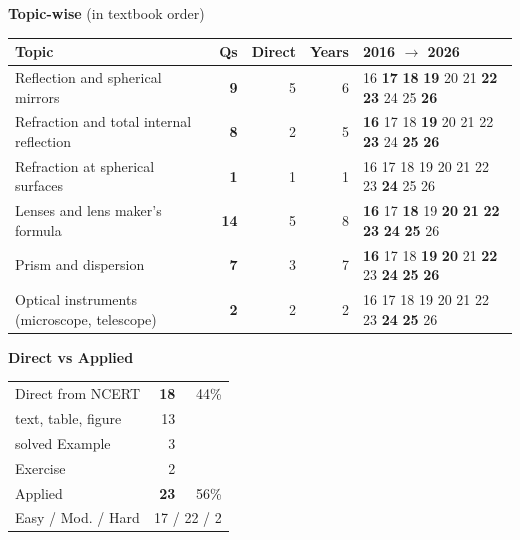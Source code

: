 {\small\textbf{\color{crimson}Topic-wise} (in textbook order)\par\smallskip
\begin{tabularx}{\linewidth}{@{}>{\raggedright\arraybackslash}Xrrrl@{}}\toprule
Topic & Qs & Direct & Years & 2016 $\rightarrow$ 2026\\\midrule
Reflection and spherical mirrors & \textbf{9} & 5 & 6 & {\scriptsize {\color{gray!45}16} \textbf{17} \textbf{18} \textbf{19} {\color{gray!45}20} {\color{gray!45}21} \textbf{22} \textbf{23} {\color{gray!45}24} {\color{gray!45}25} \textbf{26}}\\
Refraction and total internal reflection & \textbf{8} & 2 & 5 & {\scriptsize \textbf{16} {\color{gray!45}17} {\color{gray!45}18} \textbf{19} {\color{gray!45}20} {\color{gray!45}21} {\color{gray!45}22} \textbf{23} {\color{gray!45}24} \textbf{25} \textbf{26}}\\
Refraction at spherical surfaces & \textbf{1} & 1 & 1 & {\scriptsize {\color{gray!45}16} {\color{gray!45}17} {\color{gray!45}18} {\color{gray!45}19} {\color{gray!45}20} {\color{gray!45}21} {\color{gray!45}22} {\color{gray!45}23} \textbf{24} {\color{gray!45}25} {\color{gray!45}26}}\\
Lenses and lens maker's formula & \textbf{14} & 5 & 8 & {\scriptsize \textbf{16} {\color{gray!45}17} \textbf{18} {\color{gray!45}19} \textbf{20} \textbf{21} \textbf{22} \textbf{23} \textbf{24} \textbf{25} {\color{gray!45}26}}\\
Prism and dispersion & \textbf{7} & 3 & 7 & {\scriptsize \textbf{16} {\color{gray!45}17} {\color{gray!45}18} \textbf{19} \textbf{20} {\color{gray!45}21} \textbf{22} {\color{gray!45}23} \textbf{24} \textbf{25} \textbf{26}}\\
Optical instruments (microscope, telescope) & \textbf{2} & 2 & 2 & {\scriptsize {\color{gray!45}16} {\color{gray!45}17} {\color{gray!45}18} {\color{gray!45}19} {\color{gray!45}20} {\color{gray!45}21} {\color{gray!45}22} {\color{gray!45}23} \textbf{24} \textbf{25} {\color{gray!45}26}}\\
\bottomrule\end{tabularx}}\par\medskip
\begin{minipage}[t]{0.34\linewidth}{\small\textbf{\color{crimson}Direct vs Applied}\par\smallskip
\begin{tabular}{@{}lrr@{}}\toprule
Direct from NCERT & \textbf{18} & 44\%\\
\quad text, table, figure & 13 &\\
\quad solved Example & 3 &\\
\quad Exercise & 2 &\\
Applied & \textbf{23} & 56\%\\\midrule
Easy / Mod. / Hard & \multicolumn{2}{r}{17 / 22 / 2}\\\bottomrule
\end{tabular}}\end{minipage}\hfill

